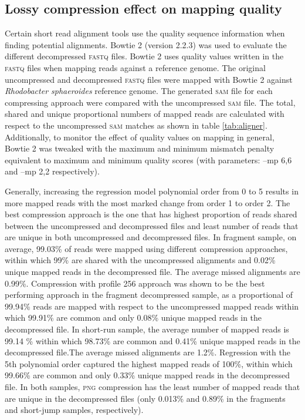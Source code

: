 \documentclass{bioinfo}
\begin{document}
\subsection{Lossy compression effect on mapping quality}

Certain short read alignment tools use the quality sequence information when finding potential alignments. Bowtie 2 (version 2.2.3) was used to evaluate the different decompressed \textsc{fastq} files. Bowtie 2 uses quality values written in the \textsc{fastq} files when mapping reads against a reference genome. The original uncompressed and decompressed \textsc{fastq} files were mapped with Bowtie 2 against \textit{Rhodobacter sphaeroides} reference genome. The generated \textsc{sam} file for each compressing approach were compared with the uncompressed \textsc{sam} file. The total, shared and unique proportional numbers of mapped reads are calculated with respect to the uncompressed \textsc{sam} matches as shown in table \ref{tab:aligner}. Additionally, to monitor the effect of quality values on mapping in general, Bowtie 2 was tweaked with the maximum and minimum mismatch penalty equivalent to maximum and minimum quality scores (with parameters: --mp 6,6 and --mp 2,2 respectively).

Generally, increasing the regression model polynomial order from 0 to 5 results in more mapped reads with the most marked change from order 1 to order 2. The best compression approach is the one that has highest proportion of reads shared between the uncompressed and decompressed files and least number of reads that are unique in both uncompressed and decompressed files. In fragment sample, on average, 99.03\% of reads were mapped using different compression approaches, within which 99\% are shared with the uncompressed alignments and 0.02\% unique mapped reads in the decompressed file. The average missed alignments are 0.99\%. Compression with profile 256 approach was shown to be the best performing approach in the fragment decompressed sample, as a proportional of 99.94\% reads are mapped with respect to the uncompressed mapped reads within which 99.91\% are common and only 0.08\% unique mapped reads in the decompressed file. In short-run sample, the average number of mapped reads is 99.14 \% within which 98.73\% are common and 0.41\% unique mapped reads in the decompressed file.The average missed alignments are 1.2\%. Regression with the 5th polynomial order captured the highest mapped reads of 100\%, within which 99.66\% are common and only 0.33\% unique mapped reads in the decompressed file. In both samples, \textsc{png} compression has the least number of mapped reads that are unique in the decompressed files (only  0.013\% and 0.89\% in the fragments and short-jump samples, respectively).
\end{document}
